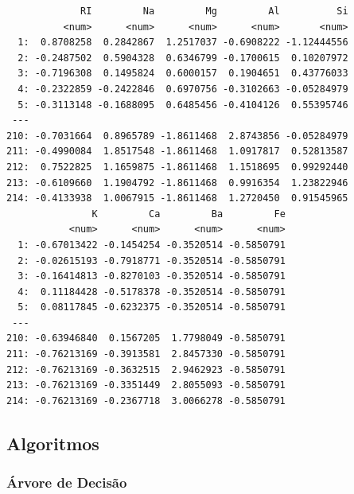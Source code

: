 \documentclass[
  letterpaper,
  DIV=11,
  numbers=noendperiod]{scrartcl}
\begin{document}
\begin{verbatim}
             RI         Na         Mg         Al          Si
          <num>      <num>      <num>      <num>       <num>
  1:  0.8708258  0.2842867  1.2517037 -0.6908222 -1.12444556
  2: -0.2487502  0.5904328  0.6346799 -0.1700615  0.10207972
  3: -0.7196308  0.1495824  0.6000157  0.1904651  0.43776033
  4: -0.2322859 -0.2422846  0.6970756 -0.3102663 -0.05284979
  5: -0.3113148 -0.1688095  0.6485456 -0.4104126  0.55395746
 ---                                                        
210: -0.7031664  0.8965789 -1.8611468  2.8743856 -0.05284979
211: -0.4990084  1.8517548 -1.8611468  1.0917817  0.52813587
212:  0.7522825  1.1659875 -1.8611468  1.1518695  0.99292440
213: -0.6109660  1.1904792 -1.8611468  0.9916354  1.23822946
214: -0.4133938  1.0067915 -1.8611468  1.2720450  0.91545965
               K         Ca         Ba         Fe
           <num>      <num>      <num>      <num>
  1: -0.67013422 -0.1454254 -0.3520514 -0.5850791
  2: -0.02615193 -0.7918771 -0.3520514 -0.5850791
  3: -0.16414813 -0.8270103 -0.3520514 -0.5850791
  4:  0.11184428 -0.5178378 -0.3520514 -0.5850791
  5:  0.08117845 -0.6232375 -0.3520514 -0.5850791
 ---                                             
210: -0.63946840  0.1567205  1.7798049 -0.5850791
211: -0.76213169 -0.3913581  2.8457330 -0.5850791
212: -0.76213169 -0.3632515  2.9462923 -0.5850791
213: -0.76213169 -0.3351449  2.8055093 -0.5850791
214: -0.76213169 -0.2367718  3.0066278 -0.5850791
\end{verbatim}

\subsection{Algoritmos}\label{algoritmos-1}

\subsubsection{Árvore de Decisão}\label{uxe1rvore-de-decisuxe3o-1}
\end{document}
